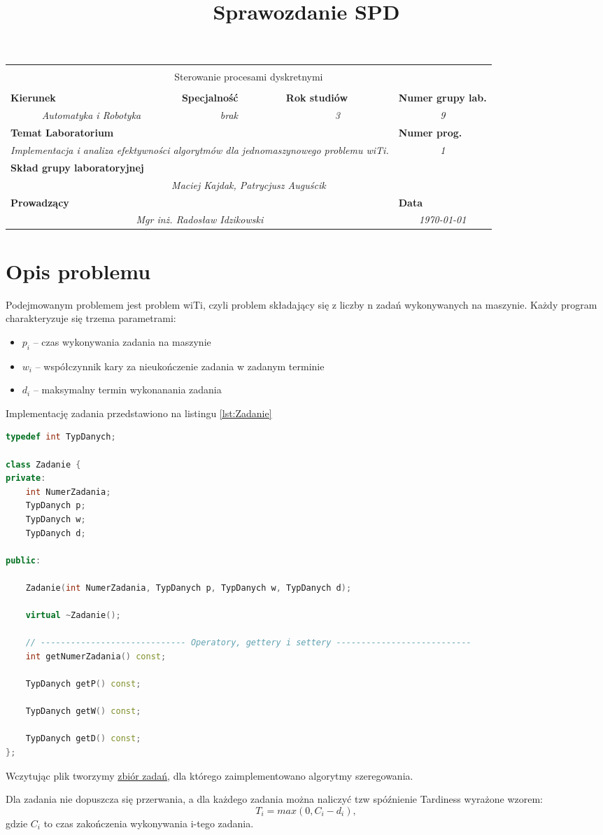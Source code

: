 \documentclass[a4paper]{article}
\title{Sprawozdanie SPD}
\newcommand{\PRzFieldDsc}[1]{\sffamily\bfseries\scriptsize #1}
\newcommand{\PRzFieldCnt}[1]{\textit{#1}}
\newcommand{\PRzHeading}[9]{


\begin{center}
\begin{tabular}{ p{0.32\textwidth} p{0.20\textwidth} p{0.20\textwidth} p{0.1\textwidth} p{0.1\textwidth} }

  &   &   &   &   \\
\hline
\multicolumn{5}{|c|}{}\\[-1ex]
\multicolumn{5}{|c|}{{\LARGE #1}}\\
\multicolumn{5}{|c|}{}\\[-1ex]

\hline
\multicolumn{1}{|l|}{\PRzFieldDsc{Kierunek}}	& \multicolumn{1}{|l|}{\PRzFieldDsc{Specjalność}}	& \multicolumn{1}{|l|}{\PRzFieldDsc{Rok studiów}}	& \multicolumn{2}{|l|}{\PRzFieldDsc{Numer grupy lab.}} \\
\multicolumn{1}{|c|}{\PRzFieldCnt{#2}}		& \multicolumn{1}{|c|}{\PRzFieldCnt{#3}}		& \multicolumn{1}{|c|}{\PRzFieldCnt{#4}}		& \multicolumn{2}{|c|}{\PRzFieldCnt{#5}} \\

\hline
\multicolumn{4}{|l|}{\PRzFieldDsc{Temat Laboratorium}}		& \multicolumn{1}{|l|}{\PRzFieldDsc{Numer prog.}} \\
\multicolumn{4}{|c|}{\PRzFieldCnt{#6}}				& \multicolumn{1}{|c|}{\PRzFieldCnt{#7}} \\

\hline
\multicolumn{5}{|l|}{\PRzFieldDsc{Skład grupy laboratoryjnej}}\\
\multicolumn{5}{|c|}{\PRzFieldCnt{#8}}\\

\hline
\multicolumn{3}{|l|}{\PRzFieldDsc{Prowadzący}}	& \multicolumn{2}{|l|}{\PRzFieldDsc{Data}} \\
\multicolumn{3}{|c|}{\PRzFieldCnt{\PRzFieldCnt{Mgr inż. Radosław Idzikowski} }}		& \multicolumn{2}{|c|}{\PRzFieldCnt{\PRzFieldCnt{#9} }} \\

\hline
\end{tabular}
\end{center}
}
\begin{document}
\PRzHeading{Sterowanie procesami dyskretnymi}{Automatyka i Robotyka}{brak}{3}{9}{Implementacja i analiza efektywności algorytmów dla jednomaszynowego problemu wiTi.}{1}{Maciej Kajdak, Patrycjusz Auguścik}{\today}{}
\pagestyle{empty}
\newpage
\section{Opis problemu}
Podejmowanym problemem jest problem wiTi, czyli problem składający się z liczby n zadań wykonywanych na maszynie. Każdy program charakteryzuje się trzema parametrami:
\begin{itemize}
	\item $p_{i}$ -- czas wykonywania zadania na maszynie
	\item $w_{i}$ -- współczynnik kary za nieukończenie zadania w zadanym terminie
	\item $d_{i}$ -- maksymalny termin wykonanania zadania
\end{itemize}
Implementację zadania przedstawiono na listingu \ref{lst:Zadanie}

\begin{lstlisting}[firstline = 3,label={lst:Zadanie},caption={Implementacja zadania},language=C++]
typedef int TypDanych;

class Zadanie {
private:
    int NumerZadania;
    TypDanych p;
    TypDanych w;
    TypDanych d;

public:
   
    Zadanie(int NumerZadania, TypDanych p, TypDanych w, TypDanych d);

    virtual ~Zadanie();

    // ----------------------------- Operatory, gettery i settery ---------------------------
    int getNumerZadania() const;

    TypDanych getP() const;

    TypDanych getW() const;

    TypDanych getD() const;
};
\end{lstlisting}
Wczytując plik tworzymy \underline{zbiór zadań}, dla którego zaimplementowano algorytmy szeregowania.

Dla zadania nie dopuszcza się przerwania, a dla każdego zadania można naliczyć tzw spóźnienie Tardiness wyrażone wzorem:
\begin{equation}
	T_{i}=max(0,C_{i} - d_{i}),
\end{equation}
gdzie $C_{i}$ to czas zakończenia wykonywania i-tego zadania.


\newpage
\end{document}
